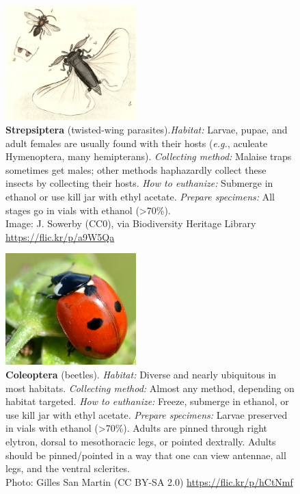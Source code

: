 \documentclass[letterpaper, 11pt]{article}
\begin{document}
\clearpage

\begin{figure}
  \caption{\textbf{Strepsiptera} (twisted-wing parasites).\textit{Habitat:} Larvae, pupae, and adult females are usually found with their hosts (\textit{e.g.}, aculeate Hymenoptera, many hemipterans). \textit{Collecting method:} Malaise traps sometimes get males; other methods haphazardly collect these insects by collecting their hosts. \textit{How to euthanize:} Submerge in ethanol or use kill jar with ethyl acetate. \textit{Prepare specimens:} All stages go in vials with ethanol (\textgreater70\%). \\ Image: J. Sowerby (CC0), via Biodiversity Heritage Library \url{https://flic.kr/p/a9W5Qa}}
  \includegraphics[width=0.45\textwidth]{Strepsiptera}
\end{figure}

\begin{figure}
  \caption{\textbf{Coleoptera} (beetles). 
  \textit{Habitat:} Diverse and nearly ubiquitous in most habitats. \textit{Collecting method:} Almost any method, depending on habitat targeted. \textit{How to euthanize:} Freeze, submerge in ethanol, or use kill jar with ethyl acetate. \textit{Prepare specimens:} Larvae preserved in vials with ethanol (\textgreater70\%). Adults are pinned through right elytron, dorsal to mesothoracic legs, or pointed dextrally. Adults should be pinned/pointed in a way that one can view antennae, all legs, and the ventral sclerites. \\ Photo: Gilles San Martin (CC BY-SA 2.0) \url{https://flic.kr/p/hCtNmf}}
  \includegraphics[width=0.45\textwidth]{Coleoptera}
\end{figure}
\end{document}
